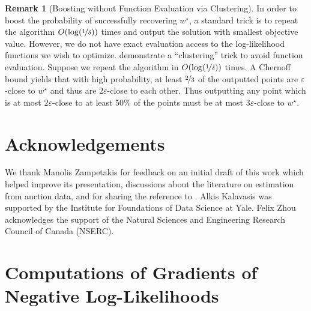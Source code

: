 \documentclass[11pt,letterpaper]{article}
\theoremstyle{plain}
\theoremstyle{definition}
\newtheorem{remark}[theorem]{Remark}
\theoremstyle{remark}
\newcommand{\nfrac}[2]{\nicefrac{#1}{#2}}
\newcommand{\eps}{\varepsilon}
\newcommand{\wstar}{{w^\star}}
\begin{document}
{{{\begin{remark}[Boosting without Function Evaluation via Clustering]
    \label{sec:SGD:clusteringBoosting}
    In order to boost the probability of successfully recovering $\wstar$,
    a standard trick is to repeat the algorithm $O(\log(\nfrac1\delta))$ times and output the solution with smallest objective value.
    However,
    we do not have exact evaluation access to the log-likelihood functions we wish to optimize.
    \cite[Section 3.4.5]{daskalakis2018efficient} demonstrate a ``clustering'' trick to avoid function evaluation.
    Suppose we repeat the algorithm in  $O(\log(\nfrac1\delta))$ times.
    A Chernoff bound yields that with high probability,
    at least $\nfrac23$ of the outputted points are $\eps$-close to $\wstar$
    and thus are $2\eps$-close to each other.
    Thus outputting any point which is at most $2\eps$-close to at least 50\% of the points must be at most $3\eps$-close to $\wstar$.
\end{remark}










    
    
\ifanon
\else
\section*{Acknowledgements}
    We thank Manolis Zampetakis for feedback on an initial draft of this work which helped improve its presentation, discussions about the literature on estimation from auction data, and for sharing the reference to \citet{meilijson1981autopsy}.
    Alkis Kalavasis was supported by the Institute for Foundations of Data Science at Yale.
    Felix Zhou acknowledges the support of the Natural Sciences and Engineering Research Council of Canada (NSERC).
\fi

\newpage
\printbibliography

\newpage

\appendix 


\section{Computations of Gradients of Negative Log-Likelihoods}\label{sec:hessian}
}}}
\end{document}
